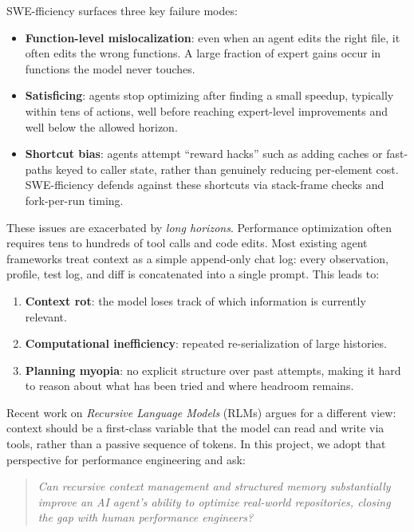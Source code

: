 \documentclass{article}
\theoremstyle{plain}
\theoremstyle{definition}
\theoremstyle{remark}
\begin{document}
SWE-fficiency surfaces three key failure modes:
\begin{itemize}
    \item \textbf{Function-level mislocalization}: even when an agent edits the right file, it often edits the wrong functions. A large fraction of expert gains occur in functions the model never touches.
    \item \textbf{Satisficing}: agents stop optimizing after finding a small speedup, typically within tens of actions, well before reaching expert-level improvements and well below the allowed horizon.
    \item \textbf{Shortcut bias}: agents attempt ``reward hacks'' such as adding caches or fast-paths keyed to caller state, rather than genuinely reducing per-element cost. SWE-fficiency defends against these shortcuts via stack-frame checks and fork-per-run timing.
\end{itemize}

These issues are exacerbated by \emph{long horizons}. Performance optimization often requires tens to hundreds of tool calls and code edits. Most existing agent frameworks treat context as a simple append-only chat log: every observation, profile, test log, and diff is concatenated into a single prompt. This leads to:
\begin{enumerate}
    \item \textbf{Context rot}: the model loses track of which information is currently relevant.
    \item \textbf{Computational inefficiency}: repeated re-serialization of large histories.
    \item \textbf{Planning myopia}: no explicit structure over past attempts, making it hard to reason about what has been tried and where headroom remains.
\end{enumerate}

Recent work on \emph{Recursive Language Models} (RLMs) argues for a different view: context should be a first-class variable that the model can read and write via tools, rather than a passive sequence of tokens. In this project, we adopt that perspective for performance engineering and ask:

\begin{quote}
\emph{Can recursive context management and structured memory substantially improve an AI agent's ability to optimize real-world repositories, closing the gap with human performance engineers?}
\end{quote}
\end{document}
